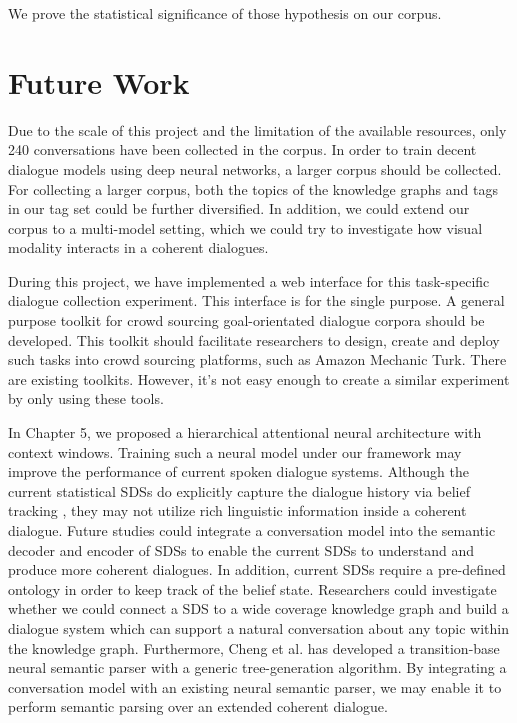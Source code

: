 \documentclass[bsc,frontabs,twoside,singlespacing,parskip,deptreport]{infthesis}     %
\begin{document}
We prove the statistical significance of those hypothesis on our corpus.

\section{Future Work}

Due to the scale of this project and the limitation of the available resources, only 240 conversations have been collected in the corpus. In order to train decent dialogue models using deep neural networks, a larger corpus should be collected. For collecting a larger corpus, both the topics of the knowledge graphs and tags in our tag set could be further diversified. In addition, we could extend our corpus to a multi-model setting, which we could try to investigate how visual modality interacts in a coherent dialogues.

During this project, we have implemented a web interface for this task-specific dialogue collection experiment. This interface is for the single purpose. A general purpose toolkit for crowd sourcing goal-orientated dialogue corpora should be developed. This toolkit should facilitate researchers to design, create and deploy such tasks into crowd sourcing platforms, such as Amazon Mechanic Turk\cite{mturk}. There are existing toolkits\cite{lee2018dialcrowd,miller2017parlai}. However, it's not easy enough to create a similar experiment by only using these tools.

In Chapter 5, we proposed a hierarchical attentional neural architecture with context windows. Training such a neural model under our framework may improve the performance of current spoken dialogue systems. Although the current statistical SDSs do explicitly capture the dialogue history via belief tracking \cite{gasic}, they may not utilize rich linguistic information inside a coherent dialogue. Future studies could integrate a conversation model into the semantic decoder and encoder of SDSs to enable the current SDSs to understand and produce more coherent dialogues. In addition, current SDSs require a pre-defined ontology in order to keep track of the belief state. Researchers could investigate whether we could connect a SDS to a wide coverage knowledge graph and build a dialogue system which can support a natural conversation about any topic within the knowledge graph. Furthermore, Cheng et al.\cite{cheng2019learning} has developed a transition-base neural semantic parser with a generic tree-generation algorithm. By integrating a conversation model with an existing neural semantic parser, we may enable it to perform semantic parsing over an extended coherent dialogue.
\end{document}

